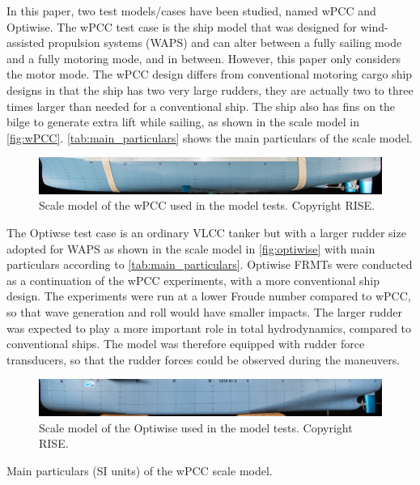 \noindent In this paper, two test models/cases have been studied, named wPCC and Optiwise. The wPCC test case is the ship model that was designed for wind-assisted propulsion systems (WAPS) and can alter between a fully sailing mode and a fully motoring mode, and in between. 
However, this paper only considers the motor mode. The wPCC design differs from conventional motoring cargo ship designs in that the ship has two very large rudders, they are actually two to three times larger than needed for a conventional ship. The ship also has fins on the bilge to generate extra lift while sailing, as shown in the scale model in \autoref{fig:wPCC}.
\autoref{tab:main_particulars} shows the main particulars of the scale model. 

\begin{figure}[h]
    \centering
    \includegraphics[width=\columnwidth]{figures/5m2.jpg}
    \caption{Scale model of the wPCC used in the model tests. Copyright RISE.}
    \label{fig:wPCC}
\end{figure}

The Optiwse test case is an ordinary VLCC tanker but with a larger rudder size adopted for WAPS as shown in the scale model in \autoref{fig:optiwise} with main particulars according to \autoref{tab:main_particulars}.
Optiwise FRMTs were conducted as a continuation of the wPCC experiments, with a more conventional ship design. The experiments were run at a lower Froude number compared to wPCC, so that wave generation and roll would have smaller impacts. The larger rudder was expected to play a more important role in total hydrodynamics, compared to conventional ships. The model was therefore equipped with rudder force transducers, so that the rudder forces could be observed during the maneuvers. 
\begin{figure}[h]
    \centering
    \includegraphics[width=\columnwidth]{figures/optiwise.jpg}
    \caption{Scale model of the Optiwise used in the model tests. Copyright RISE.}
    \label{fig:optiwise}
\end{figure}
\begin{table}[h]
    \centering
    \caption{Main particulars (SI units) of the wPCC scale model.}
    \label{tab:main_particulars}
\end{table}